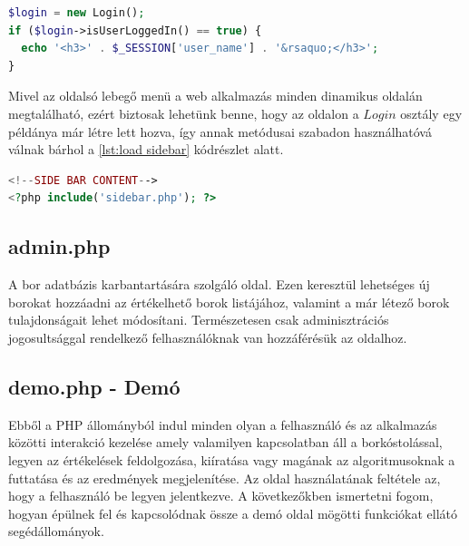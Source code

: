 \documentclass[12pt]{report}
\theoremstyle{definition}
\begin{document}
	\noindent\begin{minipage}{\linewidth}
		\begin{lstlisting}[language=php,label={lst:php login}, caption={példal a Login osztály használatára}]
$login = new Login();
if ($login->isUserLoggedIn() == true) {
  echo '<h3>' . $_SESSION['user_name'] . '&rsaquo;</h3>';
}
		\end{lstlisting}
	\end{minipage}
	
	Mivel az oldalsó lebegő menü a web alkalmazás minden dinamikus oldalán megtalálható, ezért biztosak lehetünk benne, hogy az oldalon a $Login$ osztály egy példánya már létre lett hozva, így annak metódusai szabadon használhatóvá válnak bárhol a \ref{lst:load sidebar} kódrészlet alatt.
	
	\noindent\begin{minipage}{\linewidth}
		\begin{lstlisting}[language=php,label={lst:load sidebar}, caption={Sidebar betöltése a dinamikus oldalakon}]
<!--SIDE BAR CONTENT-->
<?php include('sidebar.php'); ?>
		\end{lstlisting}
	\end{minipage}
	
	\subsection{admin.php}
	A bor adatbázis karbantartására szolgáló oldal. Ezen keresztül lehetséges új borokat hozzáadni az értékelhető borok listájához, valamint a már létező borok tulajdonságait lehet módosítani. Természetesen csak adminisztrációs jogosultsággal rendelkező felhasználóknak van hozzáférésük az oldalhoz.
	
	\subsection{demo.php - Demó}
	Ebből a PHP állományból indul minden olyan a felhasználó és az alkalmazás közötti interakció kezelése amely valamilyen kapcsolatban áll a borkóstolással, legyen az értékelések feldolgozása, kiíratása vagy magának az algoritmusoknak a futtatása és az eredmények megjelenítése. Az oldal használatának feltétele az, hogy a felhasználó be legyen jelentkezve. A következőkben ismertetni fogom, hogyan épülnek fel és kapcsolódnak össze a demó oldal mögötti funkciókat ellátó segédállományok.
	
\end{document}
